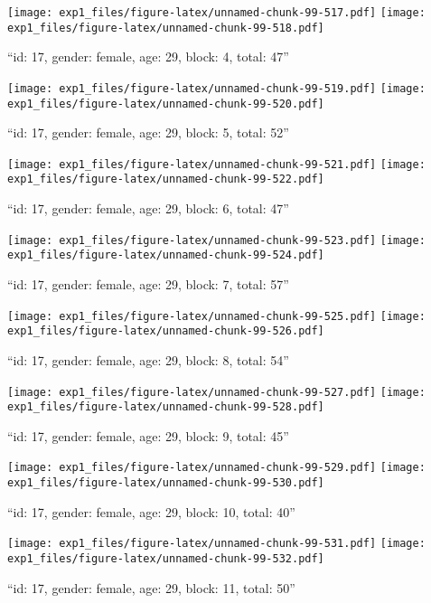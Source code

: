 \documentclass[,]{article}
\begin{document}
\texttt{[image: exp1\_files/figure-latex/unnamed-chunk-99-517.pdf]}
\texttt{[image: exp1\_files/figure-latex/unnamed-chunk-99-518.pdf]}

\newpage
[1] 

``id: 17, gender: female, age: 29, block: 4, total: 47''

\texttt{[image: exp1\_files/figure-latex/unnamed-chunk-99-519.pdf]}
\texttt{[image: exp1\_files/figure-latex/unnamed-chunk-99-520.pdf]}

\newpage
[1] 

``id: 17, gender: female, age: 29, block: 5, total: 52''

\texttt{[image: exp1\_files/figure-latex/unnamed-chunk-99-521.pdf]}
\texttt{[image: exp1\_files/figure-latex/unnamed-chunk-99-522.pdf]}

\newpage
[1] 

``id: 17, gender: female, age: 29, block: 6, total: 47''

\texttt{[image: exp1\_files/figure-latex/unnamed-chunk-99-523.pdf]}
\texttt{[image: exp1\_files/figure-latex/unnamed-chunk-99-524.pdf]}

\newpage
[1] 

``id: 17, gender: female, age: 29, block: 7, total: 57''

\texttt{[image: exp1\_files/figure-latex/unnamed-chunk-99-525.pdf]}
\texttt{[image: exp1\_files/figure-latex/unnamed-chunk-99-526.pdf]}

\newpage
[1] 

``id: 17, gender: female, age: 29, block: 8, total: 54''

\texttt{[image: exp1\_files/figure-latex/unnamed-chunk-99-527.pdf]}
\texttt{[image: exp1\_files/figure-latex/unnamed-chunk-99-528.pdf]}

\newpage
[1] 

``id: 17, gender: female, age: 29, block: 9, total: 45''

\texttt{[image: exp1\_files/figure-latex/unnamed-chunk-99-529.pdf]}
\texttt{[image: exp1\_files/figure-latex/unnamed-chunk-99-530.pdf]}

\newpage
[1] 

``id: 17, gender: female, age: 29, block: 10, total: 40''

\texttt{[image: exp1\_files/figure-latex/unnamed-chunk-99-531.pdf]}
\texttt{[image: exp1\_files/figure-latex/unnamed-chunk-99-532.pdf]}

\newpage
[1] 

``id: 17, gender: female, age: 29, block: 11, total: 50''
\end{document}
